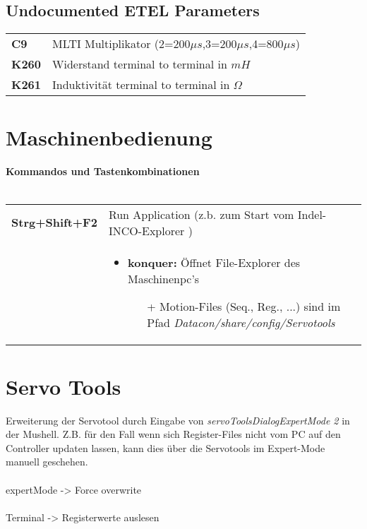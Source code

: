 	\subsection{Undocumented ETEL Parameters}
		\begin{tabular}{l|p{14cm}}
			\rowcolor{gray!10!white}
			\textbf{C9} & MLTI Multiplikator (2=200$ \mu s $,3=200$ \mu s $,4=800$ \mu s $) \\ 	
			\textbf{K260} & Widerstand terminal to terminal in $ mH $\\	
			\rowcolor{gray!10!white}
			\textbf{K261} & Induktivität terminal to terminal in $ \Omega $\\	
		\end{tabular}
\section{Maschinenbedienung}
\textbf{Kommandos und Tastenkombinationen\\\\}
\begin{tabular}{l|p{14cm}}
	\rowcolor{gray!10!white}
	\textbf{Strg+Shift+F2} & Run Application (z.b. zum Start vom Indel-INCO-Explorer )\\
	\rowcolor{gray!10!white}
	& \begin{itemize}
		\item \textbf{konquer:} Öffnet File-Explorer des Maschinenpc's
		\begin{itemize}
			\item[+] Motion-Files (Seq., Reg., ...) sind im Pfad \textit{Datacon/share/config/Servotools}
		\end{itemize}	
	\end{itemize}	
\end{tabular}

\section{Servo Tools}
	Erweiterung der Servotool durch Eingabe von \textit{servoToolsDialogExpertMode 2} in der Mushell. Z.B. für den Fall wenn sich Register-Files nicht vom PC auf den Controller updaten lassen, kann dies über die Servotools im Expert-Mode manuell geschehen.\\\\
	
	expertMode -> Force overwrite\\\\
	
	Terminal -> Registerwerte auslesen

